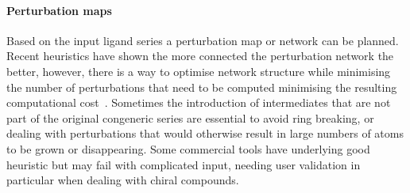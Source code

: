 \documentclass[9pt,bestpractices]{livecoms}
\begin{document}
\paragraph{Perturbation maps}
Based on the input ligand series a perturbation map or network can be planned. Recent heuristics have shown the more connected the perturbation network the better, however, there is a way to optimise network structure while minimising the number of perturbations that need to be computed minimising the resulting computational cost~\cite{yang2020optimal}. Sometimes the introduction of intermediates that are not part of the original congeneric series are essential to avoid ring breaking, or dealing with perturbations that would otherwise result in large numbers of atoms to be grown or disappearing. Some commercial tools have underlying good heuristic but may fail with complicated input, needing user validation in particular when dealing with chiral compounds. 
\end{document}
